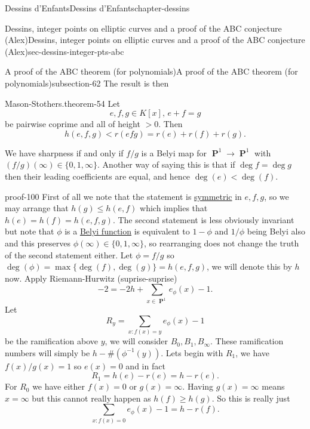 \documentclass[oneside,10pt,]{book}
\numberwithin{equation}{section}
\newcommand{\inv}{^{-1}}
\DeclareMathOperator{\PP}{\mathbf{P}}
\newcommand{\lt}{<}
\newcommand{\gt}{>}
\begin{document}
\begin{chapterptx}{Dessins d'Enfants}{}{Dessins d'Enfants}{}{}{chapter-dessins}
\begin{sectionptx}{Dessins, integer points on elliptic curves and a proof of the ABC conjecture (Alex)}{}{Dessins, integer points on elliptic curves and a proof of the ABC conjecture (Alex)}{}{}{sec-dessins-integer-pts-abc}
\begin{subsectionptx}{A proof of the ABC theorem (for polynomials)}{}{A proof of the ABC theorem (for polynomials)}{}{}{subsection-62}
The result is then%
\begin{theorem}{Mason-Stothers.}{}{theorem-54}%
\hypertarget{p-701}{}%
Let%
\begin{equation*}
e,f,g\in K[x],\,e + f = g
\end{equation*}
be pairwise coprime and all of height \(\gt 0\). Then%
\begin{equation*}
h(e,f,g) \lt r(efg) = r(e) + r(f)  + r(g)\text{.}
\end{equation*}
%
\par
\hypertarget{p-702}{}%
We have sharpness if and only if \(f/g\) is a Belyi map for \(\PP^1 \to \PP^1\) with \((f/g)(\infty) \in \{0,1,\infty\}\). Another way of saying this is that if \(\deg f = \deg g\) then their leading coefficients are equal, and hence \(\deg (e) \lt \deg (f)\).%
\end{theorem}
\begin{proofptx}{}{proof-100}
\hypertarget{p-703}{}%
First of all we note that the statement is \hyperref[def-princ-pol]{symmetric} in \(e,f,g\), so we may arrange that \(h(g) \le h(e,f)\) which implies that \(h(e) = h(f) = h(e,f,g)\). The second statement is less obviously invariant but note that \(\phi\) is  a \hyperref[def-belyi-function]{Belyi function} is equivalent to \(1-\phi\) and \(1/\phi\) being Belyi also and this preserves \(\phi(\infty) \in \{0,1,\infty\}\), so rearranging does not change the truth of the second statement either. Let \(\phi = f/g\) so \(\deg(\phi) = \max\{\deg (f), \deg(g)\} = h(e,f,g)\), we will denote this by \(h\) now. Apply Riemann-Hurwitz (suprise-suprise)%
\begin{equation*}
-2 = -2h + \sum_{x\in \PP^1} e_\phi(x) - 1\text{.}
\end{equation*}
Let%
\begin{equation*}
R_y = \sum_{x : f(x) = y} e_\phi(x) - 1
\end{equation*}
be the ramification above \(y\), we will consider \(B_0, B_1, B_\infty\). These ramification numbers will simply be \(h - \#(\phi\inv(y))\). Lets begin with \(R_1\), we have \(f(x)/g(x) = 1\) so \(e(x) = 0\) and in fact%
\begin{equation*}
R_1 = h(e) - r(e) = h - r(e)\text{.}
\end{equation*}
For \(R_0\) we have either \(f(x) = 0\) or \(g(x) = \infty\). Having \(g(x) = \infty\) means \(x = \infty\) but this cannot really happen as \(h(f) \ge h(g)\). So this is really just%
\begin{equation*}
\sum_{x : f(x) = 0} e_\phi(x) - 1 = h  - r(f)\text{.}

\end{equation*}
\end{proofptx}
\end{subsectionptx}
\end{sectionptx}
\end{chapterptx}
\end{document}
